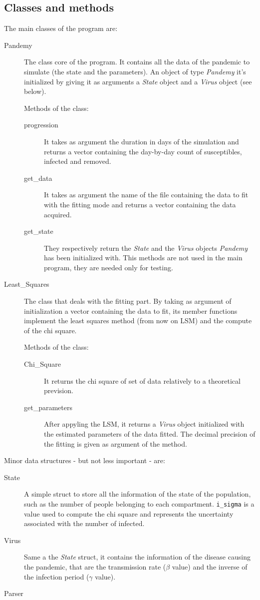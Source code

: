 \subsection{Classes and methods}

The main classes of the program are:
\begin{description}
\item[Pandemy] The class core of the program. It contains all the data of the pandemic to simulate (the state and the parameters). An object of type \emph{Pandemy} it's initialized by giving it as arguments a \emph{State} object and a \emph{Virus} object (see below).

Methods of the class:
\begin{description}
\item[progression] It takes as argument the duration in days of the simulation and returns a vector containing the day-by-day count of susceptibles, infected and removed.
\item[get\_data] It takes as argument the name of the file containing the data to fit with the fitting mode and returns a vector containing the data acquired.
\item[get\_state \and get\_virus] They respectively return the \emph{State} and the \emph{Virus} objects \emph{Pandemy} has been initialized with. This methods are not used in the main program, they are needed only for testing.
\end{description}

\item[Least\_Squares] The class that deals with the fitting part. By taking as argument of initialization a vector containing the data to fit, its member functions implement the least squares method (from now on LSM) and the compute of the chi square.

Methods of the class:
\begin{description}
\item[Chi\_Square] It returns the chi square of set of data relatively to a theoretical prevision.
\item[get\_parameters] After appyling the LSM, it returns a \emph{Virus} object initialized with the estimated parameters of the data fitted. The decimal precision of the fitting is given as argument of the method.
\end{description}

\end{description}

Minor data structures - but not less important - are:
\begin{description}
\item[State] A simple struct to store all the information of the state of the population, such as the number of people belonging to each compartment. \verb!i_sigma! is a value used to compute the chi square and represents the uncertainty associated with the number of infected. 
\item[Virus] Same a the \emph{State} struct, it contains the information of the disease causing the pandemic, that are the transmission rate ($\beta$ value) and the inverse of the infection  period ($\gamma$ value).
\item[Parser]
\end{description}

